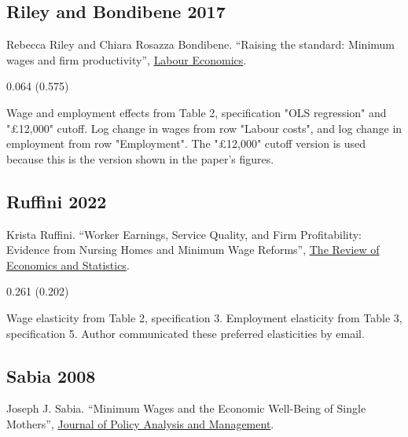 \subsection*{Riley and Bondibene 2017}
\vspace{-0.7em}

\noindent Rebecca Riley and Chiara Rosazza Bondibene. ``Raising the standard: Minimum wages and ﬁrm productivity'', \href{http://dx.doi.org/10.1016/j.labeco.2016.11.010}{Labour Economics}.

\vspace{0.7em}

 0.064 (0.575)

\vspace{0.7em}

 Wage and employment effects from Table 2, specification "OLS regression" and "£12,000" cutoff. Log change in wages from row "Labour costs", and log change in employment from row "Employment". The "£12,000" cutoff version is used because this is the version shown in the paper's figures.

\subsection*{Ruffini 2022}
\vspace{-0.7em}

\noindent Krista Ruffini. ``Worker Earnings, Service Quality, and Firm Profitability: Evidence from Nursing Homes and Minimum Wage Reforms'', \href{https://doi.org/10.1162/rest_a_01271}{The Review of Economics and Statistics}.

\vspace{0.7em}

 0.261 (0.202)

\vspace{0.7em}

 Wage elasticity from Table 2, specification 3. Employment elasticity from Table 3, specification 5. Author communicated these preferred elasticities by email.

\subsection*{Sabia 2008}
\vspace{-0.7em}

\noindent Joseph J. Sabia. ``Minimum Wages and the Economic Well-Being of Single Mothers'', \href{https://doi.org/10.1002/pam.20379}{Journal of Policy Analysis and Management}.

